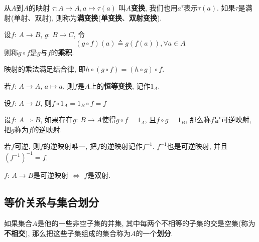 \begin{Definition}[变换]
从$A$到$A$的映射 $\tau: A \rightarrow A, a \mapsto \tau(a)$ 叫$A$\textbf{变换}, 我们也用$a^\tau$表示$\tau(a)$.
 {{如果$\tau$是满射(单射、双射), 则称为}}\textbf{满变换}(\textbf{单变换}、\textbf{双射变换}).
\end{Definition}


\begin{Definition}[映射的乘法]
设$f$: $A \rightarrow B$, $g$: $B \rightarrow C$, 令
$$
	(g \circ f)(a) \triangleq g(f(a)), \forall a \in A
$$
则称$g \circ f$是$g$与$f$的\textbf{乘积}.
\end{Definition}

\begin{Note}
映射的乘法满足结合律, 即$h \circ (g \circ f) = (h \circ g) \circ f$.
\end{Note}


\begin{Definition}
若$f$: $A \rightarrow A$, $a \mapsto a$, 则$f$是$A$上的\textbf{恒等变换}, 记作$1_A$.
\end{Definition}

\begin{Proposition}设$f$: $A \rightarrow B$, 则$f \circ 1_A = 1_B \circ f = f$
\end{Proposition}

\begin{Definition}[可逆映射]
设$f$: $A \Rightarrow B$, 如果存在$g$: $B \rightarrow A$使得$g \circ f = 1_A$, 且$f \circ g = 1_B$, 那么称$f$是可逆映射, 把$g$称为$f$的逆映射.
\end{Definition}

\begin{Note}
若$f$可逆, 则$f$的逆映射唯一, 把$f$的逆映射记作$f^{-1}$. $f^{-1}$也是可逆映射, 并且$(f^{-1})^{-1} = f$.
\end{Note}

\begin{Theorem}
$f$: $A \rightarrow B$是可逆映射 $\iff$ $f$是双射.
\end{Theorem}

\subsection{等价关系与集合划分}

\begin{Definition}[集合的划分]
如果集合$A$是他的一些非空子集的并集, 其中每两个不相等的子集的交是空集(称为\textbf{不相交}), 那么把这些子集组成的集合称为$A$的一个\textbf{划分}.
\end{Definition}

